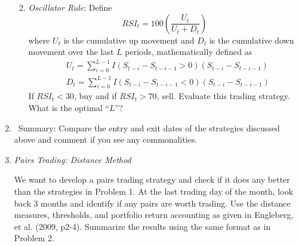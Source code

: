 \documentclass[12pt]{article}
\begin{document}
\begin{enumerate}
\begin{enumerate}
\begin{itemize}
\end{itemize}
\item{\it Oscillator Rule}: Define
$$RSI_t = 100\left(\frac{U_t}{U_t+D_t}\right)$$
where $U_t$ is the cumulative up movement and $D_t$ is the cumulative down movement over the last $L$ periods, mathematically defined as
\begin{align*}
&U_t = \sum_{i=0}^{L-1}I(S_{t-i} - S_{t-i-1}>0)(S_{t-i}-S_{t-i-1})\\
&D_t = \sum_{i=0}^{L-1}I(S_{t-i} - S_{t-i-1}<0)(S_{t-i}-S_{t-i-1})
\end{align*}
If $RSI_t<30$, buy and if $RSI_t>70$, sell. Evaluate this trading strategy. What is the optimal ``$L$''?

\end{enumerate}
\item{\ Summary}: Compare the entry and exit dates of the strategies discussed above and comment if you see any commonalities.
 

\item {\it Pairs Trading: Distance Method}

We want to develop a pairs trading strategy and check if it does any better than  the strategies in Problem 1. At the last trading day of the month, look back 3 months and identify if any pairs are worth trading. Use the distance measures, thresholds, and portfolio return accounting as given in Engleberg, et al. (2009, p2-4). Summarize the results using the same format as in Problem 2.


\end{enumerate}
\end{document}
